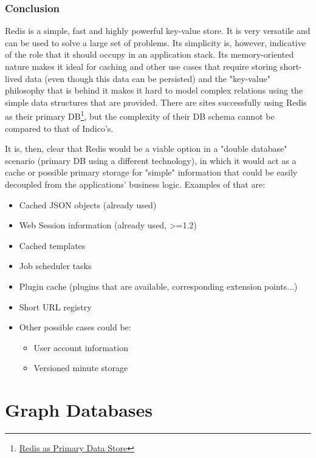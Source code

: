 \subsubsection{Conclusion}

Redis is a simple, fast and highly powerful key-value store. It is very versatile and can be used to solve a large set of problems. Its simplicity is, however, indicative of the role that it should occupy in an application stack. Its memory-oriented nature makes it ideal for caching and other use cases that require storing short-lived data (even though this data can be persisted) and the "key-value" philosophy that is behind it makes it hard to model complex relations using the simple data structures that are provided. There are sites successfully using Redis as their primary DB\footnote{\href{https://moot.it/blog/technology/redis-as-primary-datastore-wtf.html}{Redis as Primary Data Store}}, but the complexity of their DB schema cannot be compared to that of Indico's.

It is, then, clear that Redis would be a viable option in a "double database" scenario (primary DB using a different technology), in which it would act as a cache or possible primary storage for "simple" information that could be easily decoupled from the applications' business logic. Examples of that are:

\begin{itemize}
  \item Cached JSON objects (already used)
  \item Web Session information (already used, >=1.2)
  \item Cached templates
  \item Job scheduler tasks
  \item Plugin cache (plugins that are available, corresponding extension points...)
  \item Short URL registry
  \item Other possible cases could be:
  \begin{itemize}
    \item User account information
    \item Versioned minute storage
  \end{itemize}
\end{itemize}

\section{Graph Databases}

